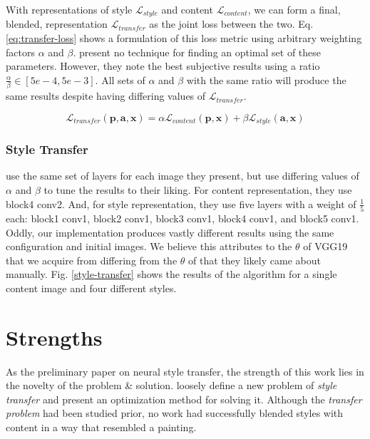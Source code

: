 \documentclass{article}
\begin{document}
With representations of style $\mathcal{L}_{style}$ and content
$\mathcal{L}_{content}$, we can form a final, blended, representation
$\mathcal{L}_{transfer}$ as the joint loss between the two. Eq.
\ref{eq:transfer-loss} shows a formulation of this loss metric using arbitrary
weighting factors $\alpha$ and $\beta$. \cite{2015arXiv150806576G} present no
technique for finding an optimal set of these parameters. However, they note
the best subjective results using a ratio $\frac{\alpha}{\beta} \in
[5e-4, 5e-3]$. All sets of $\alpha$ and $\beta$ with the same ratio will
produce the same results despite having differing values of
$\mathcal{L}_{transfer}$.

\begin{equation}
\label{eq:transfer-loss}
    \mathcal{L}_{transfer}(\mathbf{p}, \mathbf{a}, \mathbf{x}) =
    \alpha \mathcal{L}_{content}(\mathbf{p}, \mathbf{x}) +
    \beta \mathcal{L}_{style}(\mathbf{a}, \mathbf{x})
\end{equation}


\subsubsection{Style Transfer}

\cite{2015arXiv150806576G} use the same set of layers for each image they
present, but use differing values of $\alpha$ and $\beta$ to tune the results
to their liking. For content representation, they use block4 conv2. And, for
style representation, they use five layers with a weight of $\frac{1}{5}$
each: block1 conv1, block2 conv1, block3 conv1, block4 conv1, and block5
conv1. Oddly, our implementation produces vastly different results using the
same configuration and initial images. We believe this attributes to the
$\theta$ of VGG19 that we acquire from \cite{chollet2015keras} differing from
the $\theta$ of \cite{2015arXiv150806576G} that they likely came about
manually. Fig. \ref{style-transfer} shows the results of the algorithm for a
single content image and four different styles.

\section{Strengths}

As the preliminary paper on neural style transfer, the strength of this work
lies in the novelty of the problem \& solution. \cite{2015arXiv150806576G}
loosely define a new problem of \textit{style transfer} and present an
optimization method for solving it. Although the \textit{transfer problem} had
been studied prior, no work had successfully blended styles with content in a
way that resembled a painting.
\end{document}
